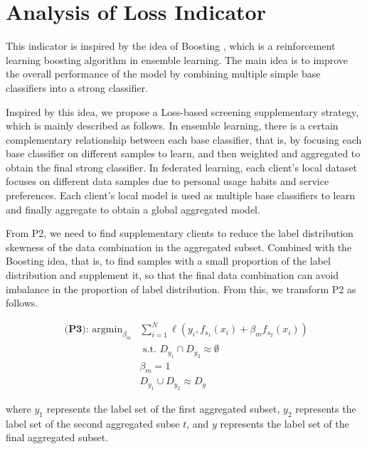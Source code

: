 \documentclass{article}
\begin{document}
\section{Analysis of Loss Indicator}\label{section1.1}
This indicator is inspired by the idea of Boosting \cite{chen2019exploring}, which is a reinforcement learning boosting algorithm in ensemble learning. The main idea is to improve the overall performance of the model by combining multiple simple base classifiers into a strong classifier. 

Inspired by this idea, we propose a Loss-based screening supplementary strategy, which is mainly described as follows. In ensemble learning, there is a certain complementary relationship between each base classifier, that is, by focusing each base classifier on different samples to learn, and then weighted and aggregated to obtain the final strong classifier. In federated learning, each client's local dataset focuses on different data samples due to personal usage habits and service preferences. Each client's local model is used as multiple base classifiers to learn and finally aggregate to obtain a global aggregated model. 

From P2, we need to find supplementary clients to reduce the label distribution skewness of the data combination in the aggregated subset. Combined with the Boosting idea, that is, to find samples with a small proportion of the label distribution and supplement it, so that the final data combination can avoid imbalance in the proportion of label distribution. From this, we transform P2 as follows.

\begin{equation}
\begin{aligned}
	\textbf { (P3): } \operatorname{argmin}_{\beta_{m}} &\sum_{i=1}^{N} \ell\left(y_{i}, f_{s_{1}}\left(x_{i}\right)+\beta_{m} f_{s_{2}}\left(x_{i}\right)\right) \\
	&\text { s.t. } D_{y_{1}} \cap D_{y_{2}} \approx \emptyset \\
	&\beta_{m}=1 \\
	&D_{y_{1}} \cup D_{y_{2}} \approx D_{y}
\end{aligned}
\end{equation}

\noindent
where $y_{1}$ represents the label set of the first aggregated subset, $y_{2}$ represents the label set of the second aggregated subse $t$, and $y$ represents the label set of the final aggregated subset.
\end{document}
